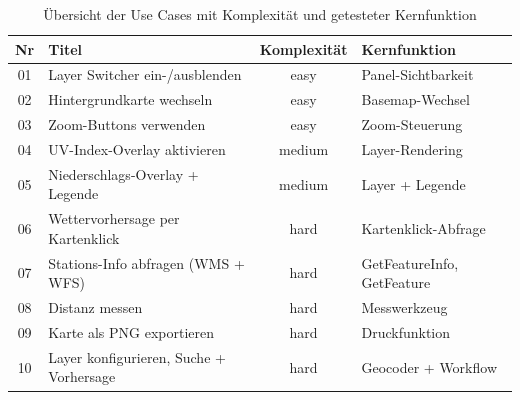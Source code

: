 \begin{table}[htbp]
    \centering
    \renewcommand{\arraystretch}{1.3}
    \begin{tabularx}{\textwidth}{@{}c >{\hsize=1.2\hsize}X c >{\hsize=0.8\hsize}X@{}}
        \toprule
        \textbf{Nr} & \textbf{Titel} & \textbf{Komplexität} & \textbf{Kernfunktion} \\
        \midrule
        01  & Layer Switcher ein-/ausblenden          & easy   & Panel-Sichtbarkeit   \\
        02  & Hintergrundkarte wechseln               & easy   & Basemap-Wechsel      \\
        03  & Zoom-Buttons verwenden                  & easy   & Zoom-Steuerung       \\
        04  & UV-Index-Overlay aktivieren             & medium & Layer-Rendering      \\
        05  & Niederschlags-Overlay + Legende         & medium & Layer + Legende      \\
        06  & Wettervorhersage per Kartenklick        & hard   & Kartenklick-Abfrage  \\
        07  & Stations-Info abfragen (WMS + WFS)      & hard   & GetFeatureInfo, GetFeature \\
        08  & Distanz messen                          & hard   & Messwerkzeug         \\
        09  & Karte als PNG exportieren               & hard   & Druckfunktion        \\
        10 & Layer konfigurieren, Suche + Vorhersage & hard   & Geocoder + Workflow  \\
        \bottomrule
    \end{tabularx}
    \caption{Übersicht der Use Cases mit Komplexität und getesteter Kernfunktion}
    \label{tab:use-cases}
\end{table}